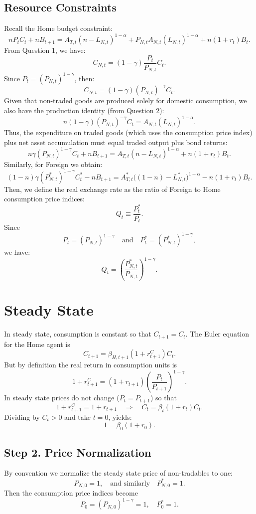 \documentclass[a4paper,12pt]{article} %
\theoremstyle{nonitalic}
\begin{document}
\subsection*{Resource Constraints}
Recall the Home budget constraint:
\[
n P_t C_t + n B_{t+1} = A_{T,t}(n-L_{N,t})^{1-\alpha} + P_{N,t}A_{N,t}(L_{N,t})^{1-\alpha} + n(1+r_t)B_t.
\]
From Question 1, we have:
\[
C_{N,t} = (1-\gamma) \frac{P_t}{P_{N,t}} C_t.
\]
Since \(P_t=(P_{N,t})^{1-\gamma}\), then:
\[
C_{N,t} = (1-\gamma)(P_{N,t})^{-\gamma}C_t.
\]
Given that non-traded goods are produced solely for domestic consumption, we also have the production identity (from Question 2):
\[
n (1-\gamma)(P_{N,t})^{-\gamma}C_t = A_{N,t}(L_{N,t})^{1-\alpha}.
\]
Thus, the expenditure on traded goods (which uses the consumption price index) plus net asset accumulation must equal traded output plus bond returns:
\[
\boxed{n\gamma (P_{N,t})^{1-\gamma}C_t + n B_{t+1} = A_{T,t}(n-L_{N,t})^{1-\alpha} + n(1+r_t)B_t.}
\]
Similarly, for Foreign we obtain:
\[
\boxed{(1-n)\gamma (P^*_{N,t})^{1-\gamma}C^*_t - n B_{t+1} = A^*_{T,t}\big((1-n)-L^*_{N,t}\big)^{1-\alpha} - n(1+r_t)B_t.}
\]
Then, we define the real exchange rate as the ratio of Foreign to Home consumption price indices:
\[
Q_t \equiv \frac{P^*_t}{P_t}.
\]
Since
\[
P_t = (P_{N,t})^{1-\gamma} \quad \text{and} \quad P^*_t = (P^*_{N,t})^{1-\gamma},
\]
we have:
\[
\boxed{Q_t = \left(\frac{P^*_{N,t}}{P_{N,t}}\right)^{1-\gamma}.}
\]

\section{Steady State}

In steady state, consumption is constant so that $C_{t+1}=C_t$. The Euler equation for the Home agent is
\[
C_{t+1} = \beta_{H,t+1}(1+r_{t+1}^C) C_t.
\]
But by definition the real return in consumption units is
\[
1+r_{t+1}^C = (1+r_{t+1})\left(\frac{P_t}{P_{t+1}}\right)^{1-\gamma}.
\]
In steady state prices do not change ($P_t=P_{t+1}$) so that
\[
1+r_{t+1}^C = 1+r_{t+1}\quad\Rightarrow\quad C_t = \beta_t(1+r_t)C_t.
\]
Dividing by $C_t>0$ and take $t=0$, yields:
\[
1=\beta_0(1+r_0).
\]

\subsection*{Step 2. Price Normalization}
By convention we normalize the steady state price of non-tradables to one:
\[
P_{N,0}=1,\quad \text{and similarly}\quad P^*_{N,0}=1.
\]
Then the consumption price indices become
\[
P_0=(P_{N,0})^{1-\gamma}=1,\quad P^*_0=1.
\]
\end{document}
